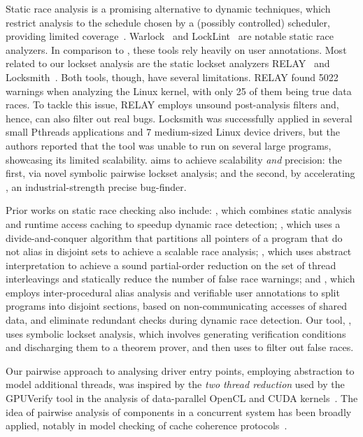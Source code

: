 Static race analysis is a promising alternative to dynamic techniques, which restrict analysis to the schedule chosen by a (possibly controlled) scheduler, providing limited coverage~\cite{musuvathi2008finding}. Warlock~\cite{sterling1993warlock} and LockLint~\cite{oracle2010locklint} are notable static race analyzers.  In comparison to \whoop, these tools rely heavily on user annotations.
%
Most related to our lockset analysis are the static lockset analyzers RELAY~\cite{voung2007relay} and Locksmith~\cite{pratikakis2006locksmith}. Both tools, though, have several limitations. RELAY found 5022 warnings when analyzing the Linux kernel, with only 25 of them being true data races. To tackle this issue, RELAY employs unsound post-analysis filters and, hence, can also filter out real bugs. Locksmith was successfully applied in several small Pthreads applications and 7 medium-sized Linux device drivers, but the authors reported that the tool was unable to run on several large programs, showcasing its limited scalability. \whoop aims to achieve scalability \emph{and} precision: the first, via novel symbolic pairwise lockset analysis; and the second, by accelerating \corral, an industrial-strength precise bug-finder.

Prior works on static race checking also include: \cite{choi2002efficient}, which combines static analysis and runtime access caching to speedup dynamic race detection; \cite{kahlon2007fast}, which uses a divide-and-conquer algorithm that partitions all pointers of a program that do not alias in disjoint sets to achieve a scalable race analysis; \cite{kahlon2009semantic}, which uses abstract interpretation to achieve a sound partial-order reduction on the set of thread interleavings and statically reduce the number of false race warnings; and \cite{das2015section}, which employs inter-procedural alias analysis and verifiable user annotations to split programs into disjoint sections, based on non-communicating accesses of shared data, and eliminate redundant checks during dynamic race detection. Our tool, \whoop, uses symbolic lockset analysis, which involves generating verification conditions and discharging them to a theorem prover, and then uses \corral to filter out false races. 

Our pairwise approach to analysing driver entry points, employing abstraction to model additional threads, was inspired by the \emph{two thread reduction} used by the GPUVerify tool in the analysis of data-parallel OpenCL and CUDA kernels~\cite{gpuverify,bardsley2014engineering}.  The idea of pairwise analysis of components in a concurrent system has been broadly applied, notably in model checking of cache coherence protocols~\cite{mcmillan1999verification}.
